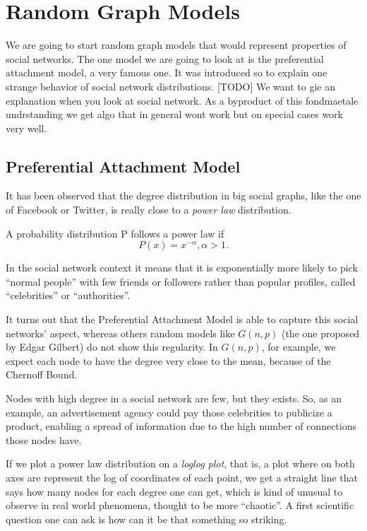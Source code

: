 \chapter{Random Graph Models}

We are going to start random graph models that would represent properties of social networks. The one model we are going to look at is the preferential attachment model, a very famous one. It was introduced so to explain one strange behavior of
social network distributions.
[TODO]
We want to gie an explanation when you look at social network. As a byproduct of this fondmaetale undrstanding we get algo that in general wont work but on special cases work very well.

\section{Preferential Attachment Model}

It has been observed that the degree distribution in big social graphs, like the one of Facebook or Twitter, is really close to a \emph{power law} distribution.

\begin{defn}
	A probability distribution P follows a power law if
	\begin{equation}
		P(x) = x^{-\alpha}, \alpha > 1.
	\end{equation}
\end{defn}

In the social network context it means that it is exponentially more likely to pick ``normal people'' with few friends or followers rather than popular profiles, called ``celebrities'' or ``authorities''.

It turns out that the Preferential Attachment Model is able to capture this social networks' aspect, whereas others random models like $G(n,p)$ (the one proposed by Edgar Gilbert) do not show this regularity. In $G(n,p)$, for example, we expect each node to have the degree very close to the mean, because of the Chernoff Bound.

Nodes with high degree in a social network are few, but they exists. So, as an example, an advertisement agency could pay those celebrities to publicize a product, enabling a spread of information due to the high number of connections those nodes have.

If we plot a power law distribution on a \emph{loglog plot}, that is, a plot where on both axes are represent the log of coordinates of each point, we get a straight line that says how many nodes for each degree one can get, which is kind of unusual to observe in real world phenomena, thought to be more ``chaotic''. A first scientific question one can ask is how can it be that something so striking.

